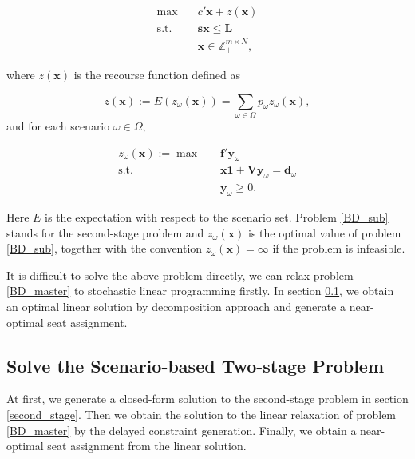 \begin{equation}\label{BD_master}
  \begin{aligned}
\max \quad & c{'} \mathbf{x}+ z(\mathbf{x}) \\
\text {s.t.} \quad & \mathbf{s} \mathbf{x} \leq \mathbf{L} \\
& \mathbf{x} \in \mathbb{Z}_{+}^{m \times N},
\end{aligned}
\end{equation}

where $z(\mathbf{x})$ is the recourse function defined as 

$$z(\mathbf{x}) := E(z_{\omega}(\mathbf{x})) = \sum_{\omega \in \Omega} p_{\omega} z_{\omega}(\mathbf{x}),$$ and for each scenario $\omega \in \Omega$, 

\begin{equation}\label{BD_sub}
  \begin{aligned}
    z_{\omega}(\mathbf{x}) := \max \quad & \mathbf{f}{'} \mathbf{y}_{\omega} \\
    \text {s.t.} \quad & \mathbf{x} \mathbf{1} + \mathbf{V} \mathbf{y}_{\omega} = \mathbf{d}_{\omega} \\
     & \mathbf{y}_{\omega} \geq 0.
  \end{aligned}
  \end{equation}


Here $E$ is the expectation with respect to the scenario set. Problem \eqref{BD_sub} stands for the second-stage problem and $z_{\omega}(\mathbf{x})$ is the optimal value of problem \eqref{BD_sub}, together with the convention $z_{\omega}(\mathbf{x}) = \infty$ if the problem is infeasible.

It is difficult to solve the above problem directly, we can relax problem \eqref{BD_master} to stochastic linear programming firstly. In section \ref{solve_by_benders}, we obtain an optimal linear solution by decomposition approach and generate a near-optimal seat assignment.

\subsection{Solve the Scenario-based Two-stage Problem}\label{solve_by_benders}

At first, we generate a closed-form solution to the second-stage problem in section \ref{second_stage}. Then we obtain the solution to the linear relaxation of problem \eqref{BD_master} by the delayed constraint generation. Finally, we obtain a near-optimal seat assignment from the linear solution.


